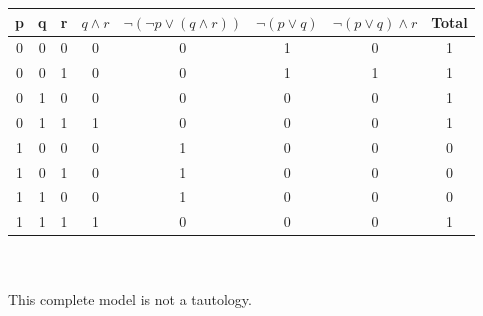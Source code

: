 \begin{large}
\begin{enumerate}
          \begin{tabular}{c|c|c|c|c|c|c||c}
            p & q & r & $ q \land r $ & $ \neg(\neg p \lor ( q \land r)) $ & $ \neg (p \lor q) $ & $ \neg (p \lor q) \land r $ & Total \\
            \hline\hline
            0 & 0 & 0 & 0             & 0                                  & 1                   & 0                           & 1     \\
            \hline
            0 & 0 & 1 & 0             & 0                                  & 1                   & 1                           & 1     \\
            \hline
            0 & 1 & 0 & 0             & 0                                  & 0                   & 0                           & 1     \\
            \hline
            0 & 1 & 1 & 1             & 0                                  & 0                   & 0                           & 1     \\
            \hline
            1 & 0 & 0 & 0             & 1                                  & 0                   & 0                           & 0     \\
            \hline
            1 & 0 & 1 & 0             & 1                                  & 0                   & 0                           & 0     \\
            \hline
            1 & 1 & 0 & 0             & 1                                  & 0                   & 0                           & 0     \\
            \hline
            1 & 1 & 1 & 1             & 0                                  & 0                   & 0                           & 1     \\
            \hline
          \end{tabular}
          \\ \\
          This complete model is not a tautology.
  \end{enumerate}
\end{large}

